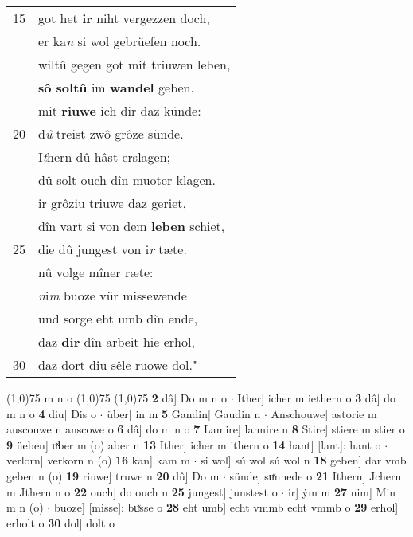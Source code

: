 \documentclass[8pt,a4paper,notitlepage]{article}
\begin{document}
\begin{table}[ht]
\begin{minipage}[t]{0.5\linewidth}
\begin{tabular}{rl}
15 & got het \textbf{ir} niht vergezzen doch,\\ 
 & er ka\textit{n} si wol gebrüefen noch.\\ 
 & wiltû gegen got mit triuwen leben,\\ 
 & \textbf{sô soltû} im \textbf{wandel} geben.\\ 
 & mit \textbf{riuwe} ich dir daz künde:\\ 
20 & d\textit{û} treist zwô grôze sünde.\\ 
 & I\textit{t}hern dû hâst erslagen;\\ 
 & dû solt ouch dîn muoter klagen.\\ 
 & ir grôziu triuwe daz geriet,\\ 
 & dîn vart si von dem \textbf{leben} schiet,\\ 
25 & die dû jungest von i\textit{r} tæte.\\ 
 & nû volge mîner ræte:\\ 
 & \textit{n}i\textit{m} buoze vür missewende\\ 
 & und sorge eht umb dîn ende,\\ 
 & daz \textbf{dir} dîn arbeit hie erhol,\\ 
30 & daz dort diu sêle ruowe dol."\\ 
\end{tabular}
\scriptsize
\line(1,0){75} \newline
m n o \newline
\line(1,0){75} \newline
\newline
\line(1,0){75} \newline
\textbf{2} dâ] Do m n o  $\cdot$ Ither] icher m iethern o \textbf{3} dâ] do m n o \textbf{4} diu] Dis o  $\cdot$ über] in m \textbf{5} Gandin] Gaudin n  $\cdot$ Anschouwe] astorie m auscouwe n anscowe o \textbf{6} dâ] do m n o \textbf{7} Lamire] lannire n \textbf{8} Stire] stiere m stier o \textbf{9} üeben] uͯber m (o) aber n \textbf{13} Ither] icher m ithern o \textbf{14} hant] [lant]: hant o  $\cdot$ verlorn] verkorn n (o) \textbf{16} kan] kam m  $\cdot$ si wol] sú wol sú wol n \textbf{18} geben] dar vmb geben n (o) \textbf{19} riuwe] truwe n \textbf{20} dû] Do m  $\cdot$ sünde] suͯnnede o \textbf{21} Ithern] Jchern m Jthern n o \textbf{22} ouch] do ouch n \textbf{25} jungest] junstest o  $\cdot$ ir] ẏm m \textbf{27} nim] Min m n (o)  $\cdot$ buoze] [misse]: buͯsse o \textbf{28} eht umb] echt vmmb echt vmmb o \textbf{29} erhol] erholt o \textbf{30} dol] dolt o \newline
\end{minipage}
\end{table}
\end{document}
